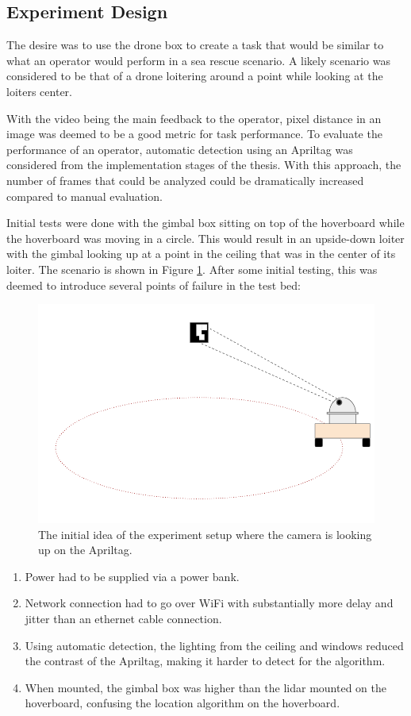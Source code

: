 \documentclass[nofilelist]{cslthse-msc}
\begin{document}
\subsection{Experiment Design}
The desire was to use the drone box to create a task that would be similar to what an operator would perform in a sea rescue scenario. A likely scenario was considered to be that of a drone loitering around a point while looking at the loiters center. 

With the video being the main feedback to the operator, pixel distance in an image was deemed to be a good metric for task performance. To evaluate the performance of an operator, automatic detection using an Apriltag was considered from the implementation stages of the thesis. With this approach, the number of frames that could be analyzed could be dramatically increased compared to manual evaluation.

Initial tests were done with the gimbal box sitting on top of the hoverboard while the hoverboard was moving in a circle. This would result in an upside-down loiter with the gimbal looking up at a point in the ceiling that was in the center of its loiter. The scenario is shown in Figure \ref{fig:testbed-idea-1}. After some initial testing, this was deemed to introduce several points of failure in the test bed:

\begin{figure}[htp]
   \centering
   \includegraphics[width=.6\textwidth]{images/testbed1.png}
   \caption{The initial idea of the experiment setup where the camera is looking up on the Apriltag. }
   \label{fig:testbed-idea-1}
\end{figure}

\begin{enumerate}
   \item Power had to be supplied via a power bank.
   \item Network connection had to go over WiFi with substantially more delay and jitter than an ethernet cable connection. 
   \item Using automatic detection, the lighting from the ceiling and windows reduced the contrast of the Apriltag, making it harder to detect for the algorithm.
   \item When mounted, the gimbal box was higher than the lidar mounted on the hoverboard, confusing the location algorithm on the hoverboard.
\end{enumerate}
\end{document}
